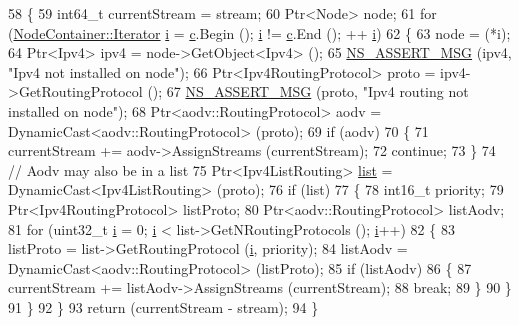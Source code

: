 \begin{DoxyCode}
58 \{
59   int64\_t currentStream = stream;
60   Ptr<Node> node;
61   \textcolor{keywordflow}{for} (\hyperlink{classns3_1_1NodeContainer_aa1a9f2d2b09bfef7d066d3974bca2cc4}{NodeContainer::Iterator} \hyperlink{bernuolliDistribution_8m_a6f6ccfcf58b31cb6412107d9d5281426}{i} = \hyperlink{lte_2model_2fading-traces_2fading__trace__generator_8m_ae0323a9039add2978bf5b49550572c7c}{c}.Begin (); \hyperlink{bernuolliDistribution_8m_a6f6ccfcf58b31cb6412107d9d5281426}{i} != \hyperlink{lte_2model_2fading-traces_2fading__trace__generator_8m_ae0323a9039add2978bf5b49550572c7c}{c}.End (); ++
      \hyperlink{bernuolliDistribution_8m_a6f6ccfcf58b31cb6412107d9d5281426}{i})
62     \{
63       node = (*i);
64       Ptr<Ipv4> ipv4 = node->GetObject<Ipv4> ();
65       \hyperlink{assert_8h_aff5ece9066c74e681e74999856f08539}{NS\_ASSERT\_MSG} (ipv4, \textcolor{stringliteral}{"Ipv4 not installed on node"});
66       Ptr<Ipv4RoutingProtocol> proto = ipv4->GetRoutingProtocol ();
67       \hyperlink{assert_8h_aff5ece9066c74e681e74999856f08539}{NS\_ASSERT\_MSG} (proto, \textcolor{stringliteral}{"Ipv4 routing not installed on node"});
68       Ptr<aodv::RoutingProtocol> aodv = DynamicCast<aodv::RoutingProtocol> (proto);
69       \textcolor{keywordflow}{if} (aodv)
70         \{
71           currentStream += aodv->AssignStreams (currentStream);
72           \textcolor{keywordflow}{continue};
73         \}
74       \textcolor{comment}{// Aodv may also be in a list}
75       Ptr<Ipv4ListRouting> \hyperlink{openflow-interface_8h_afd9bcfa176617760671b67580f536fa7}{list} = DynamicCast<Ipv4ListRouting> (proto);
76       \textcolor{keywordflow}{if} (list)
77         \{
78           int16\_t priority;
79           Ptr<Ipv4RoutingProtocol> listProto;
80           Ptr<aodv::RoutingProtocol> listAodv;
81           \textcolor{keywordflow}{for} (uint32\_t \hyperlink{bernuolliDistribution_8m_a6f6ccfcf58b31cb6412107d9d5281426}{i} = 0; \hyperlink{bernuolliDistribution_8m_a6f6ccfcf58b31cb6412107d9d5281426}{i} < list->GetNRoutingProtocols (); \hyperlink{bernuolliDistribution_8m_a6f6ccfcf58b31cb6412107d9d5281426}{i}++)
82             \{
83               listProto = list->GetRoutingProtocol (\hyperlink{bernuolliDistribution_8m_a6f6ccfcf58b31cb6412107d9d5281426}{i}, priority);
84               listAodv = DynamicCast<aodv::RoutingProtocol> (listProto);
85               \textcolor{keywordflow}{if} (listAodv)
86                 \{
87                   currentStream += listAodv->AssignStreams (currentStream);
88                   \textcolor{keywordflow}{break};
89                 \}
90             \}
91         \}
92     \}
93   \textcolor{keywordflow}{return} (currentStream - stream);
94 \}
\end{DoxyCode}


